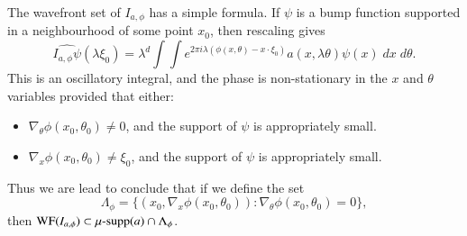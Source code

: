 The wavefront set of $I_{a,\phi}$ has a simple formula. If $\psi$ is a bump function supported in a neighbourhood of some point $x_0$, then rescaling gives
%
\[ \widehat{I_{a,\phi} \psi}(\lambda \xi_0) = \lambda^d \int \int e^{2 \pi i \lambda (\phi(x,\theta) - x \cdot \xi_0)} a(x,\lambda \theta) \psi(x)\; dx\; d\theta. \]
%
This is an oscillatory integral, and the phase is non-stationary in the $x$ and $\theta$ variables provided that either:%
\begin{itemize}
    \item $\nabla_\theta \phi(x_0,\theta_0) \neq 0$, and the support of $\psi$ is appropriately small.

    \item $\nabla_x \phi(x_0,\theta_0) \neq \xi_0$, and the support of $\psi$ is appropriately small.
\end{itemize}
%
Thus we are lead to conclude that if we define the set
%
\[ \Lambda_\phi = \{ (x_0, \nabla_x \phi(x_0,\theta_0)) : \nabla_\theta \phi(x_0, \theta_0) = 0 \}, \]
%
then $\text{WF}(I_{a,\phi}) \subset \operatorname{\text{$\mu$-supp}}(a) \cap \Lambda_\phi$.

